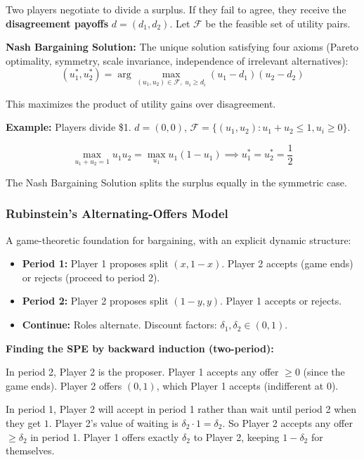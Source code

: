\documentclass[hidelinks]{article}
\begin{document}
Two players negotiate to divide a surplus. If they fail to agree, they receive the \textbf{disagreement payoffs} $d = (d_1, d_2)$. Let $\mathcal{F}$ be the feasible set of utility pairs.

\textbf{Nash Bargaining Solution:} The unique solution satisfying four axioms (Pareto optimality, symmetry, scale invariance, independence of irrelevant alternatives):
\[
(u_1^*, u_2^*) = \arg\max_{(u_1, u_2) \in \mathcal{F},\; u_i \geq d_i} (u_1 - d_1)(u_2 - d_2)
\]

This maximizes the product of utility gains over disagreement. 

\textbf{Example:} Players divide \$1. $d = (0,0)$, $\mathcal{F} = \{(u_1, u_2) : u_1 + u_2 \leq 1, u_i \geq 0\}$.

\[
\max_{u_1 + u_2 = 1} u_1 u_2 = \max_{u_1} u_1(1 - u_1) \implies u_1^* = u_2^* = \frac{1}{2}
\]

The Nash Bargaining Solution splits the surplus equally in the symmetric case.

\subsubsection{Rubinstein's Alternating-Offers Model}

A game-theoretic foundation for bargaining, with an explicit dynamic structure:

\begin{itemize}
    \item \textbf{Period 1:} Player 1 proposes split $(x, 1-x)$. Player 2 accepts (game ends) or rejects (proceed to period 2).
    \item \textbf{Period 2:} Player 2 proposes split $(1-y, y)$. Player 1 accepts or rejects.
    \item \textbf{Continue:} Roles alternate. Discount factors: $\delta_1, \delta_2 \in (0,1)$.
\end{itemize}

\textbf{Finding the SPE by backward induction (two-period):}

In period 2, Player 2 is the proposer. Player 1 accepts any offer $\geq 0$ (since the game ends). Player 2 offers $(0, 1)$, which Player 1 accepts (indifferent at $0$).

In period 1, Player 2 will accept in period 1 rather than wait until period 2 when they get $1$. Player 2's value of waiting is $\delta_2 \cdot 1 = \delta_2$. So Player 2 accepts any offer $\geq \delta_2$ in period 1. Player 1 offers exactly $\delta_2$ to Player 2, keeping $1 - \delta_2$ for themselves.
\end{document}
